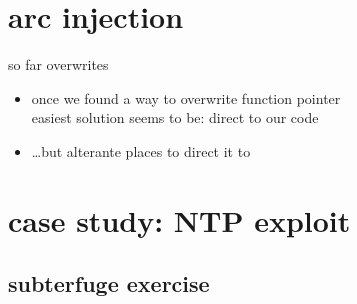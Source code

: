
\section{arc injection}
\begin{frame}{so far overwrites}
    \begin{itemize}
    \item once we found a way to overwrite function pointer\\
          easiest solution seems to be: direct to our code
    \item \ldots but alterante places to direct it to
    \end{itemize}
\end{frame}



\section{case study: NTP exploit}


\subsection{subterfuge exercise}

